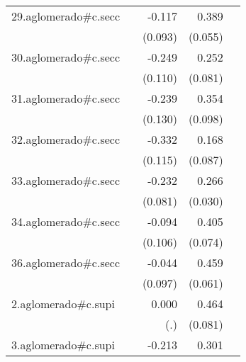 {\begin{longtable}{l*{4}{D{.}{.}{-1}}}
\addlinespace
29.aglomerado#c.secc&                     &      -0.117         &       0.389\sym{***}&                     \\
            &                     &     (0.093)         &     (0.055)         &                     \\
\addlinespace
30.aglomerado#c.secc&                     &      -0.249\sym{*}  &       0.252\sym{**} &                     \\
            &                     &     (0.110)         &     (0.081)         &                     \\
\addlinespace
31.aglomerado#c.secc&                     &      -0.239         &       0.354\sym{***}&                     \\
            &                     &     (0.130)         &     (0.098)         &                     \\
\addlinespace
32.aglomerado#c.secc&                     &      -0.332\sym{**} &       0.168         &                     \\
            &                     &     (0.115)         &     (0.087)         &                     \\
\addlinespace
33.aglomerado#c.secc&                     &      -0.232\sym{**} &       0.266\sym{***}&                     \\
            &                     &     (0.081)         &     (0.030)         &                     \\
\addlinespace
34.aglomerado#c.secc&                     &      -0.094         &       0.405\sym{***}&                     \\
            &                     &     (0.106)         &     (0.074)         &                     \\
\addlinespace
36.aglomerado#c.secc&                     &      -0.044         &       0.459\sym{***}&                     \\
            &                     &     (0.097)         &     (0.061)         &                     \\
\addlinespace
2.aglomerado#c.supi&                     &       0.000         &       0.464\sym{***}&                     \\
            &                     &         (.)         &     (0.081)         &                     \\
\addlinespace
3.aglomerado#c.supi&                     &      -0.213         &       0.301\sym{***}&                     \\

\end{longtable}}
